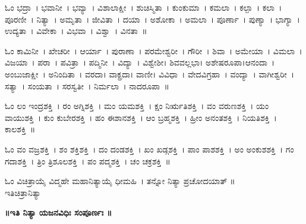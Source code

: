ಓಂ ಭದ್ರಾ~। ಭವಾನೀ~। ಭವ್ಯಾ~। ವಿಶಾಲಾಕ್ಷೀ~। ಶುಚಿಸ್ಮಿತಾ~। ಕುಂಕುಮಾ~। ಕಮಲಾ~। ಕಲ್ಪಾ~। ಕಲಾ~। ಪೂರಣೀ~। ನಿತ್ಯಾ~। ಅಮೃತಾ~। ಜೀವಿತಾ~। ದಯಾ~। ಅಶೋಕಾ~। ಅಮಲಾ~। ಪೂರ್ಣಾ~। ಪುಣ್ಯಾ~। ಭಾಗ್ಯಾ~। ಉದ್ಯತಾ~। ವಿವೇಕಾ~। ವಿಭವಾ~। ವಿಶ್ವಾ~। ವಿನತಾ~॥ 

ಓಂ ಕಾಮಿನೀ~। ಖೇಚರೀ~। ಆರ್ಯಾ~। ಪುರಾಣಾ~। ಪರಮೇಶ್ವರೀ~। ಗೌರೀ~। ಶಿವಾ~। ಅಮೇಯಾ~। ವಿಮಲಾ~। ವಿಜಯಾ~। ಪರಾ~। ಪವಿತ್ರಾ~। ಪದ್ಮಿನೀ~। ವಿದ್ಯಾ~। ವಿಶ್ವೇಶೀ। ಶಿವವಲ್ಲಭಾ। ಅಶೇಷರೂಪಾ।ಆನಂದಾ~। ಅಂಬುಜಾಕ್ಷೀ~। ಅನಿಂದಿತಾ~। ವರದಾ। ವಾಕ್ಪ್ರದಾ। ವಾಣೀ। ವಿವಿಧಾ~। ವೇದವಿಗ್ರಹಾ~। ವಂದ್ಯಾ~। ವಾಗೀಶ್ವರೀ~। ಸತ್ಯಾ~। ಸಂಯತಾ~। ಸರಸ್ವತೀ~। ನಿರ್ಮಲಾ~। ನಾದರೂಪಾ~॥

ಓಂ ಲಂ ಇಂದ್ರಶಕ್ತಿ~। ರಂ ಅಗ್ನಿಶಕ್ತಿ~। ಮಂ ಯಮಶಕ್ತಿ~। ಕ್ಷಂ ನಿರ್ಋತಿಶಕ್ತಿ~। ವಂ ವರುಣಶಕ್ತಿ~। ಯಂ ವಾಯುಶಕ್ತಿ~। ಕುಂ ಕುಬೇರಶಕ್ತಿ~। ಹಂ ಈಶಾನಶಕ್ತಿ~। ಆಂ ಬ್ರಹ್ಮಶಕ್ತಿ~। ಹ್ರೀಂ ಅನಂತಶಕ್ತಿ~। ನಿಯತಿಶಕ್ತಿ~। ಕಾಲಶಕ್ತಿ~॥

ಓಂ ವಂ ವಜ್ರಶಕ್ತಿ~। ಶಂ ಶಕ್ತಿಶಕ್ತಿ~। ದಂ ದಂಡಶಕ್ತಿ~। ಖಂ ಖಡ್ಗಶಕ್ತಿ~। ಪಾಂ ಪಾಶಶಕ್ತಿ~। ಅಂ ಅಂಕುಶಶಕ್ತಿ~। ಗಂ ಗದಾಶಕ್ತಿ~। ತ್ರಿಂ ತ್ರಿಶೂಲಶಕ್ತಿ~। ಪಂ ಪದ್ಮಶಕ್ತಿ~। ಚಂ ಚಕ್ರಶಕ್ತಿ~॥

ಓಂ ವಿಚಿತ್ರಾಯೈ ವಿದ್ಮಹೇ ಮಹಾನಿತ್ಯಾಯೈ ಧೀಮಹಿ~। ತನ್ನೋ ನಿತ್ಯಾ ಪ್ರಚೋದಯಾತ್ ॥\\
ಇತಿಚಿತ್ರಾನಿತ್ಯಾ
\begin{center}{\bfseries ॥ಇತಿ ನಿತ್ಯಾ ಯಜನವಿಧಿಃ ಸಂಪೂರ್ಣಃ ॥}\end{center}
